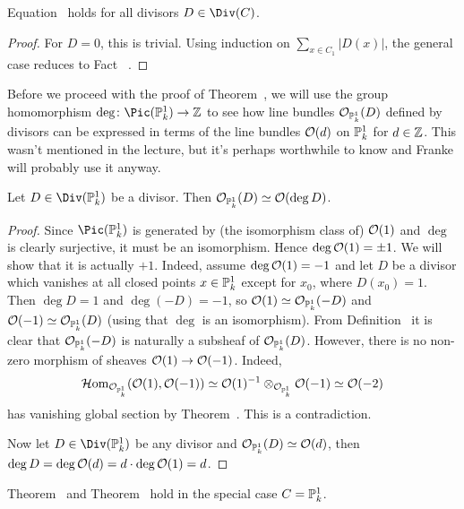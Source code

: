 \documentclass[a4paper,parskip=half,numbers=enddot, DIV=12]{scrreprt}
\begin{document}
\begin{fact}
	Equation~ holds for all divisors $D\in\Div(C)$.
\end{fact}
\begin{proof}
	For $D=0$, this is trivial. Using induction on $\sum_{x\in C_1}|D(x)|$, the general case reduces to Fact~ .
\end{proof}
Before we proceed with the proof of Theorem~, we will use the group homomorphism $\deg\colon \Pic(\IP_k^1)\morphism\IZ$ to see how line bundles $\mathcal{O}_{\mathbb{P}_k^1}(D)$ defined by divisors can be expressed in terms of the line bundles $\mathcal{O}(d)$ on $\mathbb{P}_k^1$ for $d\in\mathbb{Z}$. This wasn't mentioned in the lecture, but it's perhaps worthwhile to know and Franke will probably use it anyway.
\begin{cor}
	Let $D\in\Div(\IP_k^1)$ be a divisor. Then $\mathcal{O}_{\mathbb{P}_k^1}(D)\simeq \mathcal{O}(\deg D)$.
\end{cor}
\begin{proof}
	Since $\Pic(\IP_k^1)$ is generated by (the isomorphism class of) $\mathcal{O}(1)$ and $\deg$ is clearly surjective, it must be an isomorphism. Hence $\deg \mathcal{O}(1)=\pm 1$. We will show that it is actually $+1$. Indeed, assume $\deg\mathcal{O}(1)=-1$ and let $D$ be a divisor which vanishes at all closed points $x\in \mathbb{P}_k^1$ except for $x_0$, where $D(x_0)=1$. Then $\deg D=1$ and $\deg (-D)=-1$, so $\mathcal{O}(1)\simeq \mathcal{O}_{\mathbb{P}_k^1}(-D)$ and $\mathcal{O}(-1)\simeq \mathcal{O}_{\mathbb{P}_k^1}(D)$ (using that $\deg$ is an isomorphism). From Definition~ it is clear that $\mathcal{O}_{\mathbb{P}_k^1}(-D)$ is naturally a subsheaf of $\mathcal{O}_{\mathbb{P}_k^1}(D)$. However, there is no non-zero morphism of sheaves $\Oo(1)\morphism\Oo(-1)$. Indeed, 
	\begin{align*}
		\operatorname{\mathcal{H} om}_{\mathcal{O}_{\mathbb{P}_k^1}}(\mathcal{O}(1),\mathcal{O}(-1))\simeq \mathcal{O}(1)^{-1}\otimes_{\mathcal{O}_{\mathbb{P}_k^1}}\mathcal{O}(-1)\simeq \mathcal{O}(-2)
	\end{align*}
	has vanishing global section by Theorem~. This is a contradiction.
	
	Now let $D\in\Div(\IP_k^1)$ be any divisor and $\mathcal{O}_{\mathbb{P}_k^1}(D)\simeq\mathcal{O}(d)$, then $\deg D=\deg\mathcal{O}(d)=d\cdot \deg\mathcal{O}(1)=d$.
\end{proof}
\begin{fact}
	Theorem~ and Theorem~ hold in the special case $C=\mathbb{P}_k^1$.
\end{fact}
\end{document}
